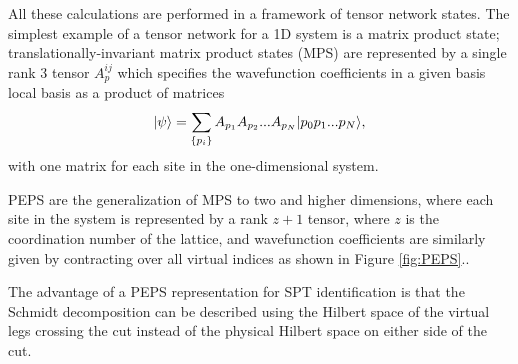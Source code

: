 All these calculations are performed in a framework of tensor network states.
The simplest example of a tensor network for a 1D system is a matrix
product state; translationally-invariant matrix product states (MPS)
are represented by a single rank 3 tensor $A_p^{ij}$ which specifies
the wavefunction coefficients in a given basis local basis as a
product of matrices $$\vert \psi \rangle = \sum\limits_{\{p_i\}} A_{p_1}
A_{p_2} ... A_{p_N} \vert p_0 p_1 ... p_N \rangle,$$ with one matrix for each
site in the one-dimensional system.

PEPS are the generalization of MPS to two and higher dimensions, where
each site in the system is represented by a rank $z+1$ tensor, where
$z$ is the coordination number of the lattice, and wavefunction
coefficients are similarly given by contracting over all virtual
indices as shown in Figure \ref{fig:PEPS}.\cite{verstraete2004}.

The advantage of a PEPS representation for SPT identification is that the 
Schmidt decomposition can be described using the Hilbert space of the virtual 
legs crossing the cut instead of the physical Hilbert space on either side of 
the cut.